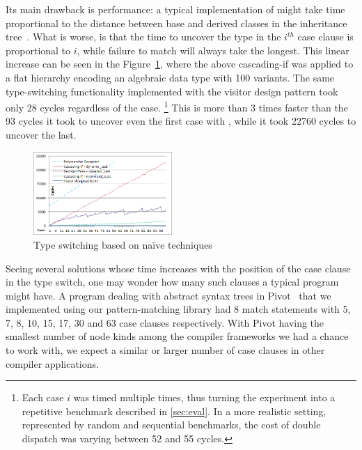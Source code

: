 \noindent
Its main drawback is performance: a typical 
implementation of  might take time proportional to the 
distance between base and derived classes in the inheritance tree~\cite{XXXXX}.
What is worse, is that the time to uncover the type in the $i^{th}$ case clause 
is proportional to $i$, while failure to match will always take the longest. 
This linear increase can be seen in the Figure~\ref{fig:DCastVis1}, where 
the above cascading-if was applied to a flat hierarchy encoding an algebraic 
data type with 100 variants. The same type-switching functionality implemented 
with the visitor design pattern took only 28 cycles regardless of the case.
\footnote{Each case $i$ was timed multiple times, thus turning the experiment 
into a repetitive benchmark described in \textsection\ref{sec:eval}. In a more
realistic setting, represented by random and sequential benchmarks, the cost of 
double dispatch was varying between 52 and 55 cycles.}
This is more than 3 times faster than the 93 cycles it took to uncover even the 
first case with , while it took 22760 cycles to uncover the 
last.

\begin{figure}[htbp]
  \centering
    \includegraphics[width=0.47\textwidth]{DCast-vs-Visitors1.png}
  \caption{Type switching based on na\"ive techniques}
  \label{fig:DCastVis1}
\end{figure}

\noindent
Seeing several solutions whose time increases with the position of the case 
clause in the type switch, one may wonder how many such clauses a typical 
program might have. A program dealing with abstract syntax trees in 
Pivot~\cite{Pivot09} that we implemented using our pattern-matching library had 
8 match statements with 5, 7, 8, 10, 15, 17, 30 and 63 case clauses 
respectively. With Pivot having the smallest number of node kinds among the 
compiler frameworks we had a chance to work with, we expect a similar or larger 
number of case clauses in other compiler applications.

